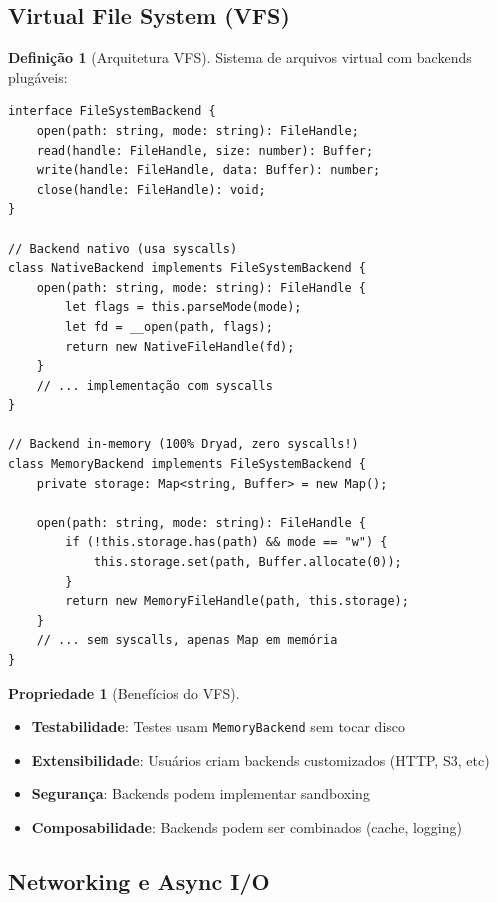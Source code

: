 \documentclass[12pt,a4paper]{article}
\theoremstyle{definition}
\newtheorem{definition}{Definição}[section]
\newtheorem{property}{Propriedade}[section]
\begin{document}
\subsection{Virtual File System (VFS)}

\begin{definition}[Arquitetura VFS]
Sistema de arquivos virtual com backends plugáveis:

\begin{verbatim}
interface FileSystemBackend {
    open(path: string, mode: string): FileHandle;
    read(handle: FileHandle, size: number): Buffer;
    write(handle: FileHandle, data: Buffer): number;
    close(handle: FileHandle): void;
}

// Backend nativo (usa syscalls)
class NativeBackend implements FileSystemBackend {
    open(path: string, mode: string): FileHandle {
        let flags = this.parseMode(mode);
        let fd = __open(path, flags);
        return new NativeFileHandle(fd);
    }
    // ... implementação com syscalls
}

// Backend in-memory (100% Dryad, zero syscalls!)
class MemoryBackend implements FileSystemBackend {
    private storage: Map<string, Buffer> = new Map();
    
    open(path: string, mode: string): FileHandle {
        if (!this.storage.has(path) && mode == "w") {
            this.storage.set(path, Buffer.allocate(0));
        }
        return new MemoryFileHandle(path, this.storage);
    }
    // ... sem syscalls, apenas Map em memória
}
\end{verbatim}
\end{definition}

\begin{property}[Benefícios do VFS]
\begin{itemize}
    \item \textbf{Testabilidade}: Testes usam \texttt{MemoryBackend} sem tocar disco
    \item \textbf{Extensibilidade}: Usuários criam backends customizados (HTTP, S3, etc)
    \item \textbf{Segurança}: Backends podem implementar sandboxing
    \item \textbf{Composabilidade}: Backends podem ser combinados (cache, logging)
\end{itemize}
\end{property}

\subsection{Networking e Async I/O}
\end{document}
